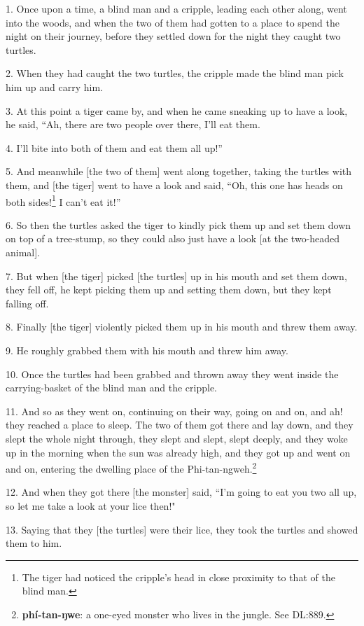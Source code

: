 \setcounter{footnote}{0}

1. Once upon a time, a blind man and a cripple, leading each other along, went into
the woods, and when the two of them had gotten to a place to spend the night on
their journey, before they settled down for the night they caught two turtles.

2. When they had caught the two turtles, the cripple made the blind man pick him
up and carry him.

3. At this point a tiger came by, and when he came sneaking up to have a look, he
said, ``Ah, there are two people over there, I'll eat them.

4. I'll bite into both of them and eat them all up!''

5. And meanwhile [the two of them] went along together, taking the turtles with
them, and [the tiger] went to have a look and said, ``Oh, this one has heads on
both sides!\footnote{The tiger had noticed the cripple's head in close proximity to that of the blind man.} I can't eat it!''

6. So then the turtles asked the tiger to kindly pick them up and set them down
on top of a tree-stump, so they could also just have a look [at the two-headed
animal].

7. But when [the tiger] picked [the turtles] up in his mouth and set them down,
they fell off, he kept picking them up and setting them down, but they kept falling
off.

8. Finally [the tiger] violently picked them up in his mouth and threw them away.

9. He roughly grabbed them with his mouth and threw him away.

10. Once the turtles had been grabbed and thrown away they went inside the carrying-basket
of the blind man and the cripple.

11. And so as they went on, continuing on their way, going on and on, and ah! they
reached a place to sleep. The two of them got there and lay down, and they slept
the whole night through, they slept and slept, slept deeply, and they woke up in
the morning when the sun was already high, and they got up and went on and on,
entering the dwelling place of the Phi-tan-ngweh.\footnote{\textbf{phí-tan-ŋwe}: a one-eyed monster who lives in the jungle. See DL:889.}

12. And when they got there [the monster] said, ``I'm going to eat you two all up,
so let me take a look at your lice then!"

13. Saying that they [the turtles] were their lice, they took the turtles and showed
them to him.

